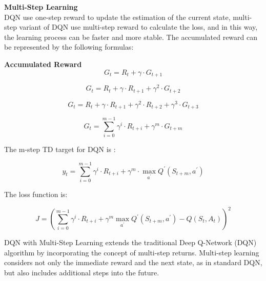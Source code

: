 \documentclass{article}
\begin{document}
\newpage
\noindent
\textbf{Multi-Step Learning}\\
\noindent
DQN use one-step reward to update the estimation of the current state, multi-step variant of DQN use multi-step reward to calculate the loss, and in this way, the learning process can be faster and more stable. The accumulated reward can be represented by the following formulas:

\begin{mdframed}[hidealllines=false,backgroundcolor=white!20]
\textbf{Accumulated Reward}\\

\begin{equation}
G_t=R_t+\gamma \cdot G_{t+1}
\end{equation}

\begin{equation}
G_t=R_t+\gamma \cdot R_{t+1}+\gamma^2 \cdot G_{t+2}
\end{equation}

\begin{equation}
G_t=R_t+\gamma \cdot R_{t+1}+\gamma^2 \cdot R_{t+2}+\gamma^3 \cdot G_{t+3}
\end{equation}

\begin{equation}
G_t=\sum_{i=0}^{m-1} \gamma^i \cdot R_{t+i}+\gamma^m \cdot G_{t+m}
\end{equation}
\end{mdframed}

\noindent
The m-step TD target for DQN is :


\begin{equation}
y_t=\sum_{i=0}^{m-1} \gamma^i \cdot R_{t+i}+\gamma^m \cdot \max _{a^{\prime}} Q^{\prime}\left(S_{t+m}, a^{\prime}\right)
\end{equation}



\noindent
The loss function is:

\begin{equation}
J = \left(\sum_{i=0}^{m-1} \gamma^i \cdot R_{t+i}+\gamma^{m} \max _{a^{\prime}} Q^{\prime}\left(S_{t+m}, a^{\prime}\right)-Q\left(S_t, A_t\right)\right)^2
\end{equation}

DQN with Multi-Step Learning extends the traditional Deep Q-Network (DQN) algorithm by incorporating the concept of multi-step returns. Multi-step learning considers not only the immediate reward and the next state, as in standard DQN, but also includes additional steps into the future.
\end{document}
